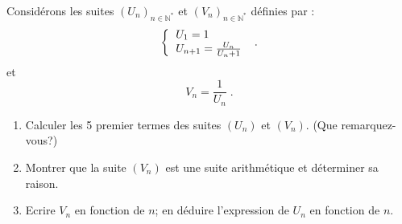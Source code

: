 \begin{exo}
Consid\'erons les suites $(U_n)_{n \in \mathbb{N}^*}$ et $(V_n)_{n \in \mathbb{N}^*}$ d\'efinies par :
\[
\left\lbrace
\begin{tabular}{l}
$U_1 = 1$ \\
$U_{n+1} = \frac{U_n}{U_n + 1}$
\end{tabular}
\right. \; .
\]
et 
$$
V_n = \frac{1}{U_n} \; .
$$
\begin{enumerate}
      \item Calculer les 5 premier termes des suites $(U_n)$ et $(V_n)$. (Que remarquez-vous?)
      \item Montrer que la suite $(V_n)$ est une suite arithm\'etique et d\'eterminer sa raison.
      \item Ecrire $V_n$ en fonction de $n$; en d\'eduire l'expression de $U_n$ en fonction de $n$.
\end{enumerate}
\end{exo}
%
%

